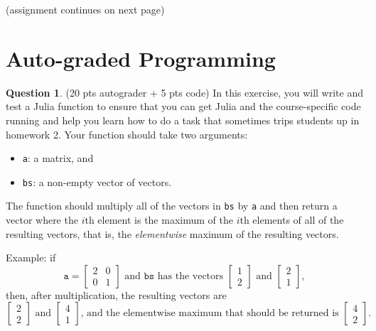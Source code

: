 \documentclass{article}
\theoremstyle{definition}
\newtheorem{question}[thm]{Question}
\begin{document}
(assignment continues on next page)

\pagebreak

\section{Auto-graded Programming}

\begin{question} (20 pts autograder + 5 pts code)
    In this exercise, you will write and test a Julia function to ensure that you can get Julia and the course-specific code running and help you learn how to do a task that sometimes trips students up in homework 2. Your function should take two arguments:
    \begin{itemize}[nosep]
        \item \texttt{a}: a matrix, and
        \item \texttt{bs}: a non-empty vector of vectors.
    \end{itemize}
    The function should multiply all of the vectors in \texttt{bs} by \texttt{a} and then return a vector where the $i$th element is the maximum of the $i$th elements of all of the resulting vectors, that is, the \emph{elementwise} maximum of the resulting vectors.

    Example: if
    \begin{equation}
        \texttt{a} = \begin{bmatrix} 2 & 0 \\ 0 & 1 \end{bmatrix}  \text{ and } \texttt{bs} \text{ has the vectors } \begin{bmatrix} 1 \\ 2 \end{bmatrix} \text{ and } \begin{bmatrix} 2 \\ 1 \end{bmatrix},
    \end{equation}
    then, after multiplication, the resulting vectors are
    \begin{equation}
        \begin{bmatrix} 2 \\ 2 \end{bmatrix} \text{ and } \begin{bmatrix} 4 \\ 1 \end{bmatrix} \text{, and the elementwise maximum that should be returned is } \begin{bmatrix} 4 \\ 2 \end{bmatrix} \text{.}
    \end{equation}


\end{question}
\end{document}
